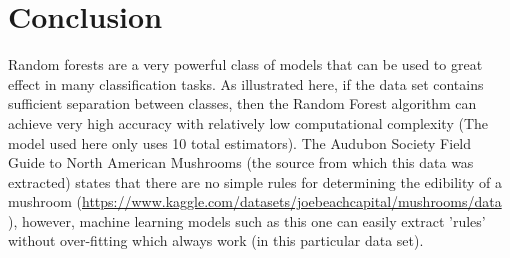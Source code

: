 \documentclass[]{article}
\begin{document}
\newpage
\section{Conclusion}
Random forests are a very powerful class of models that can be used to great effect in many classification tasks. As illustrated here, if the data set contains sufficient separation between classes, then the Random Forest algorithm can achieve very high accuracy with relatively low computational complexity (The model used here only uses 10 total estimators). The Audubon Society Field Guide to North American Mushrooms (the source from which this data was extracted) states that there are no simple rules for determining the edibility of a mushroom (\url{https://www.kaggle.com/datasets/joebeachcapital/mushrooms/data}{ }), however, machine learning models such as this one can easily extract 'rules' without over-fitting which always work (in this particular data set).
\end{document}
